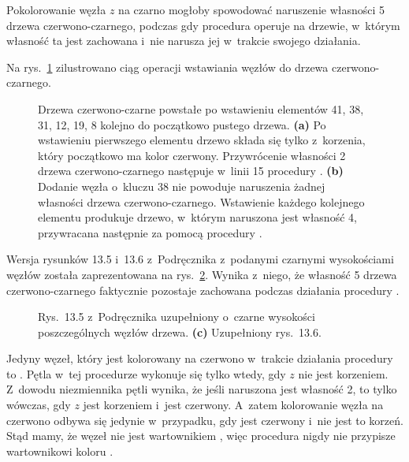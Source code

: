 \vspace{-2ex}

\exercise %
Pokolorowanie węzła $z$ na czarno mogłoby spowodować naruszenie własności 5 drzewa czerwono-czarnego, podczas gdy procedura  operuje na drzewie, w~którym własność ta jest zachowana i~nie narusza jej w~trakcie swojego działania.

\exercise %
Na rys.\ \ref{fig:13.3-2} zilustrowano ciąg operacji wstawiania węzłów do drzewa czerwono-czarnego.
\begin{figure}[!ht]
	\centering 
	\caption{Drzewa czerwono-czarne powstałe po wstawieniu elementów 41, 38, 31, 12, 19, 8 kolejno do początkowo pustego drzewa.
	{\sffamily\bfseries(a)} Po wstawieniu pierwszego elementu drzewo składa się tylko z~korzenia, który początkowo ma kolor czerwony.
	Przywrócenie własności 2 drzewa czerwono-czarnego następuje w~linii 15 procedury .
	{\sffamily\bfseries(b)} Dodanie węzła o~kluczu 38 nie powoduje naruszenia żadnej własności drzewa czerwono-czarnego.
	{\sffamily\bfseries{}} Wstawienie każdego kolejnego elementu produkuje drzewo, w~którym naruszona jest własność 4, przywracana następnie za pomocą procedury .} \label{fig:13.3-2}
\end{figure}

\exercise %
Wersja rysunków 13.5 i~13.6 z~Podręcznika z~podanymi czarnymi wysokościami węzłów została zaprezentowana na rys.\ \ref{fig:13.3-3}.
Wynika z~niego, że własność 5 drzewa czerwono-czarnego faktycznie pozostaje zachowana podczas działania procedury .
\begin{figure}[!ht]
	\centering 
	\caption{{\sffamily\bfseries{}} Rys.\ 13.5 z~Podręcznika uzupełniony o~czarne wysokości poszczególnych węzłów drzewa.
	{\sffamily\bfseries(c)} Uzupełniony rys.\ 13.6.} \label{fig:13.3-3}
\end{figure}

\exercise %
Jedyny węzeł, który jest kolorowany na czerwono w~trakcie działania procedury  to .
Pętla  w~tej procedurze wykonuje się tylko wtedy, gdy $z$ nie jest korzeniem.
Z~dowodu niezmiennika pętli  wynika, że jeśli naruszona jest własność 2, to tylko wówczas, gdy $z$ jest korzeniem i~jest czerwony.
A~zatem kolorowanie węzła  na czerwono odbywa się jedynie w~przypadku, gdy  jest czerwony i~nie jest to korzeń.
Stąd mamy, że węzeł  nie jest wartownikiem , więc procedura  nigdy nie przypisze wartownikowi koloru .

